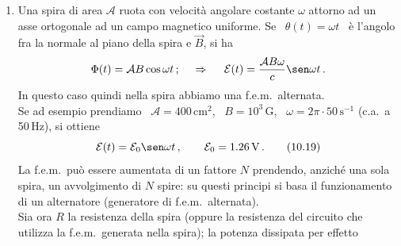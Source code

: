 \begin{enumerate}
    Supponiamo ora che un generatore $G$ faccia circolare nel circuito una
    corrente $I$, mantenendola costante (``generatore di corrente''). Il campo
    magnetico esercita sulla sbarretta una forza data dalla (10.15): preso
    l'asse $x$ orientato da sinistra verso destra, e supposto che per $t=0$ la
    sbarretta sia ferma si ha
    \begin{equation}
      F_x=\frac{IBd}{c}\,;\qquad v_x=\frac{F_x}{m}t=\frac{IBd}{mc}t
      \tag{10.17}
    \end{equation}
    cio\`e la sbarretta viene messa in moto e quindi il sistema \`e
    sostanzialmente un (rudimentale) motore elettrico. Da dove proviene
    l'energia cinetica della sbarretta? Dalla discussione fatta sopra risulta
    che l'energia deve essere fornita dal generatore $G$: infatti la
    f.e.m.\ indotta nel circuito \`e data dalla (10.14) e il generatore $G$, per
    mantenere $I$ costante, deve aumentare di $-\mathcal E$ la propria f.e.m.,
    quindi fornire (in pi\`u) una potenza
    \begin{equation}
      W=-\mathcal EI=\frac{I}{c}Bvd
      =F_xv_x=\frac{d}{dt}\big(\frac{1}{2}mv^2\big).
      \tag{10.18}
    \end{equation}
  \item Una spira di area $\mathcal A$ ruota con velocit\`a angolare costante
    $\omega$ attorno ad un asse ortogonale ad un campo magnetico uniforme. Se
    \ $\theta(t)=\omega t$ \ \`e l'angolo fra la normale al piano della spira e
    $\vec B$, si ha
    \[
      \Phi(t)=\mathcal AB\cos\omega t\,;\quad\ \Rightarrow
      \quad\ \mathcal E(t)=\frac{\mathcal AB\omega}{c}\sen\omega t\,.
    \]
    In questo caso quindi nella spira abbiamo una f.e.m.\ alternata.\\
    Se ad esempio prendiamo \ $\mathcal A=400\,\mathrm{cm}^2$, \ $B=10^3$\,G,
    \ $\omega=2\pi\cdot50\,\mathrm{s}^{-1}$ (c.a.\ a 50\,Hz), si ottiene
    \begin{equation}
      \mathcal E(t)=\mathcal E_0\sen\omega t\,,
      \qquad\mathcal E_0=1.26\,\mathrm{V}\,.
      \tag{10.19}
    \end{equation}
    La f.e.m.\ pu\`o essere aumentata di un fattore $N$ prendendo, anzich\'e una
    sola spira, un avvolgimento di $N$ spire: su questi principi si basa il
    funzionamento di un alternatore (generatore di f.e.m.\ alternata).\\
    Sia ora $R$ la resistenza della spira (oppure la resistenza del circuito che
    utilizza la f.e.m.\ generata nella spira); la potenza dissipata per effetto

\end{enumerate}
